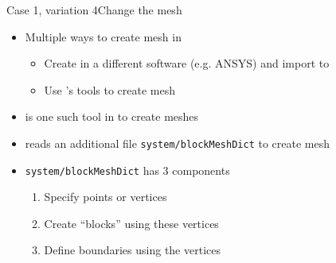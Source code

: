 \begin{frame}{Case 1, variation 4}{Change the mesh}
    \begin{itemize}
        \setitemsep{1em}
        \item Multiple ways to create mesh in \openfoam
        \begin{itemize}
            \item Create in a different software (e.g. ANSYS) and import to \openfoam
            \item Use \openfoam's tools to create mesh
        \end{itemize}
        \item \blockmesh{} is one such tool in \openfoam{} to create meshes
        \item \blockmesh{} reads an additional file \texttt{system/blockMeshDict} to create mesh
        \item \texttt{system/blockMeshDict} has 3 components
        \begin{enumerate}
            \item Specify points or vertices
            \item Create ``blocks'' using these vertices
            \item Define boundaries using the vertices
        \end{enumerate}
    \end{itemize}
\end{frame}

